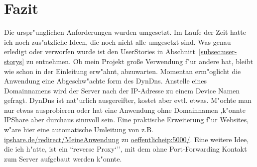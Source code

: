 
\chapter{Fazit}\label{ch:fazit}
Die urspr{"u}nglichen Anforderungen wurden umgesetzt.
Im Laufe der Zeit hatte ich noch zus{"a}tzliche Ideen, die noch nicht alle umgesetzt sind.
Was genau erledigt oder verworfen wurde ist den UserStories in Abschnitt~\ref{subsec:user-storys} zu entnehmen.
Ob mein Projekt gro{\ss}e Verwendung f{"u}r andere hat, bleibt wie schon in der Einleitung erw{"a}hnt, abzuwarten.
Momentan erm{"o}glicht die Anwendung eine Abgeschw{"a}chte form des DynDns.
Anstelle eines Domainnamens wird der Server nach der IP-Adresse zu einem Device Namen gefragt.
DynDns ist nat{"u}rlich ausgereifter, kostet aber evtl. etwas.
M{"o}chte man nur etwas ausprobieren oder hat eine Anwendung ohne Domainnamen ,k{"o}nnte IPShare aber durchaus sinnvoll sein.
Eine praktische Erweiterung f{"u}r Websites, w{"a}re hier eine automatische Umleitung von z.B. \url{ipshare.de/redirect/MeineAnwendung} zu \url{oeffentlicheip:5000/}.
Eine weitere Idee, die ich h{"a}tte, ist ein ``reverse Proxy`'', mit dem ohne Port-Forwarding Kontakt zum Server aufgebaut werden k{"o}nnte.
